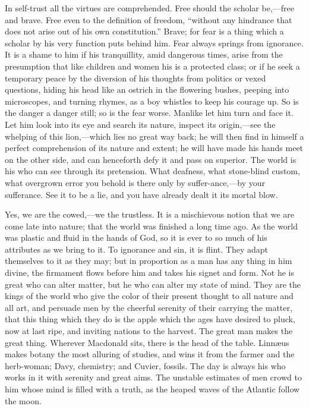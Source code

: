 In self-trust all the virtues are comprehended. Free should
the scholar be,---free and brave. Free even to the definition of
freedom, ``without any hindrance that does not arise out of his own
constitution.'' Brave; for fear is a thing which a scholar by his very
function puts behind him. Fear always springs from ignorance. It is a
shame to him if his tranquillity, amid dangerous times, arise from the
presumption that like children and women his is a protected class; or
if he seek a temporary peace by the diversion of his thoughts from
politics or vexed questions, hiding his head like an ostrich in the
flowering bushes, peeping into microscopes, and turning rhymes, as a
boy whistles to keep his courage up. So is the danger a danger still;
so is the fear worse. Manlike let him turn and face it. Let him look
into its eye and search its nature, inspect its or\-i\-gin,---see the
whelping of this li\-on,---which lies no great way back; he will then
find in himself a perfect comprehension of its nature and extent; he
will have made his hands meet on the other side, and can henceforth
defy it and pass on superior. The world is his who can see through its
pretension. What deafness, what stone-blind custom, what overgrown
error you behold is there only by suffer-ance,---by your
sufferance. See it to be a lie, and you have already dealt it its
mortal blow.

Yes, we are the cowed,---we the trustless. It is a mischievous notion
that we are come late into nature; that the world was finished a long
time ago. As the world was plastic and fluid in the hands of God, so
it is ever to so much of his attributes as we bring to it. To
ignorance and sin, it is flint. They adapt themselves to it as they
may; but in proportion as a man has any thing in him divine, the
firmament flows before him and takes his signet and form. Not he is
great who can alter matter, but he who can alter my state of mind.
They are the kings of the world who give the color of their present
thought to all nature and all art, and persuade men by the cheerful
serenity of their carrying the matter, that this thing which they do
is the apple which the ages have desired to pluck, now at last ripe,
and inviting nations to the harvest. The great man makes the great
thing. Wherever Macdonald sits, there is the head of the table.
Linn{\ae}us makes botany the most alluring of studies, and wins it
from the farmer and the herb-woman; Davy, chemistry; and Cuvier,
fossils. The day is always his who works in it with serenity and great
aims. The unstable estimates  of men crowd to him whose
mind is filled with a truth, as the heaped waves of the Atlantic
follow the moon.

